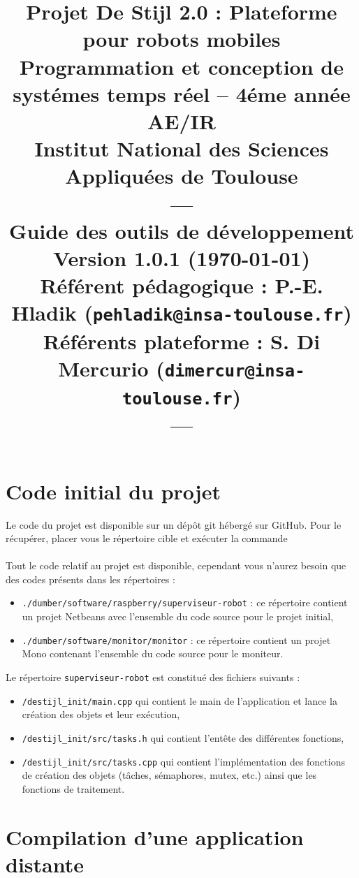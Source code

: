 \documentclass[11pt]{paper}
\title{{\Huge Projet De Stijl 2.0}
{\small : Plateforme pour robots mobiles}\\
{\scriptsize Programmation et conception de systémes temps réel -- 4éme année AE/IR}\\
{\scriptsize Institut National des Sciences Appliquées de Toulouse}\\
---\\
Guide des outils de développement \\
{\large Version 1.0.1 (\today)}\\
{\scriptsize Référent pédagogique : P.-E. Hladik (\texttt{pehladik@insa-toulouse.fr})}\\
{\scriptsize Référents plateforme : S. Di Mercurio (\texttt{dimercur@insa-toulouse.fr})}\\
---
}
\begin{document}
\maketitle

\section{Code initial du projet}
\label{sec:git}

Le code du projet est disponible sur un dépôt git hébergé sur GitHub. Pour le récupérer, placer vous le répertoire cible et exécuter la commande\\ \indent{}\\

Tout le code relatif au projet est disponible, cependant vous n'aurez besoin que des codes présents dans les répertoires :
\begin{itemize}
	\item {\tt ./dumber/software/raspberry/superviseur-robot} : ce répertoire contient un projet Netbeans avec l'ensemble du code source pour le projet initial,
	\item {\tt ./dumber/software/monitor/monitor} : ce répertoire contient un projet Mono contenant l'ensemble du code source pour le moniteur.\\
\end{itemize}

Le répertoire {\tt superviseur-robot} est constitué des fichiers suivants :
\begin{itemize}
\item {\tt /destijl\_init/main.cpp} qui contient le main de l'application et lance la création des objets et leur exécution,
\item {\tt /destijl\_init/src/tasks.h} qui contient l'entête des différentes fonctions,
\item {\tt /destijl\_init/src/tasks.cpp} qui contient l'implémentation des fonctions de création des objets (tâches, sémaphores, mutex, etc.) ainsi que les fonctions de traitement.
\end{itemize}




\section{Compilation d'une application distante}
\end{document}
